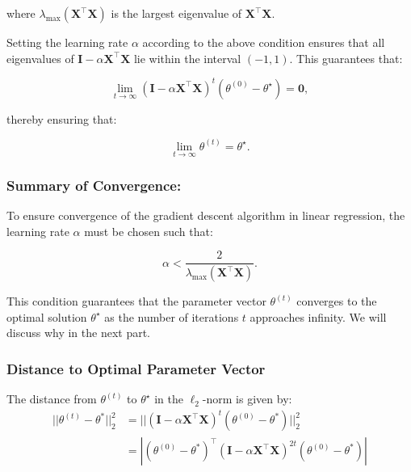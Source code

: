 where \(\lambda_{\max}(\boldsymbol{X}^\top \boldsymbol{X})\) is the largest eigenvalue of \(\boldsymbol{X}^\top \boldsymbol{X}\).


Setting the learning rate \(\alpha\) according to the above condition ensures that all eigenvalues of \(\mathbf{I} - \alpha \boldsymbol{X}^\top \boldsymbol{X}\) lie within the interval \((-1, 1)\). This guarantees that:

\[
    \lim_{t \to \infty} (\mathbf{I} - \alpha \boldsymbol{X}^\top \boldsymbol{X})^t (\theta^{(0)} - \theta^\star) = \mathbf{0},
\]

thereby ensuring that:

\[
    \lim_{t \to \infty} \theta^{(t)} = \theta^\star.
\]

\subsubsection{Summary of Convergence:}

To ensure convergence of the gradient descent algorithm in linear regression, the learning rate \(\alpha\) must be chosen such that:

\[
    \alpha < \frac{2}{\lambda_{\max}(\boldsymbol{X}^\top \boldsymbol{X})}.
\]

This condition guarantees that the parameter vector \(\theta^{(t)}\) converges to the optimal solution \(\theta^\star\) as the number of iterations \(t\) approaches infinity. We will discuss why in the next part.

\subsubsection{Distance to Optimal Parameter Vector}

The distance from \(\theta^{(t)}\) to \(\theta^\star\) in the \(\ell_2\)-norm is given by:
\[\begin{aligned}
    ||\theta^{(t)}-\theta^{*}||_{2}^{2} & =||(\mathbf{I}-\alpha\mathbf{X}^{\top}\mathbf{X})^{t}(\theta^{(0)}-\theta^{*})||_{2}^{2}                                \\
                        & =|(\theta^{(0)}-\theta^{*})^{\top}(\mathbf{I}-\alpha\boldsymbol{X}^{\top}\boldsymbol{X})^{2t}(\theta^{(0)}-\theta^{*})|
    \end{aligned}\]


